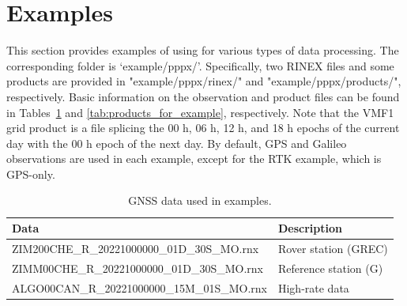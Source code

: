 \section{Examples}

This section provides examples of using \pppx{} for various types of data processing.
The corresponding folder is `example/pppx/'.
Specifically, two RINEX files and some products are provided in "example/pppx/rinex/"
and "example/pppx/products/", respectively.
Basic information on the observation and product files can be found in
Tables~\ref{tab:data_for_example} and \ref{tab:products_for_example}, respectively.
Note that the VMF1 grid product is a file splicing the 00 h, 06 h, 12 h, and 18 h epochs
of the current day with the 00 h epoch of the next day.
By default, GPS and Galileo observations are used in each example,
except for the RTK example, which is GPS-only.

 
\begin{table}[!hbt]
    \centering
    \caption{GNSS data used in examples.}
    \label{tab:data_for_example}
    \begin{tabular}{ll}
    \toprule
        Data & Description \\
    \midrule
        ZIM200CHE\_R\_20221000000\_01D\_30S\_MO.rnx & Rover station (GREC) \\
        ZIMM00CHE\_R\_20221000000\_01D\_30S\_MO.rnx & Reference station (G) \\
        ALGO00CAN\_R\_20221000000\_15M\_01S\_MO.rnx & High-rate data \\
    \bottomrule
    \end{tabular}
\end{table}


